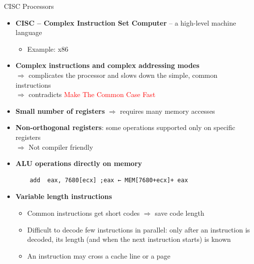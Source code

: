 \documentclass[aspectratio=169,12pt]{beamer}
\begin{document}
\begin{frame}[fragile]{CISC Processors}
\begin{itemize}
    \item \textbf{CISC -- Complex Instruction Set Computer} -- a high-level machine language
    \begin{itemize}
        \item Example: x86
    \end{itemize}
    \item \textbf{Complex instructions and complex addressing modes}\\
    $\Rightarrow$ complicates the processor and slows down the simple, common instructions\\
    $\Rightarrow$ contradicts \textcolor{red}{Make The Common Case Fast}
    \item \textbf{Small number of registers} $\Rightarrow$ requires many memory accesses
    \item \textbf{Non-orthogonal registers}: some operations supported only on specific registers\\
    $\Rightarrow$ Not compiler friendly
    \item \textbf{ALU operations directly on memory}
    \begin{verbatim}
    add  eax, 7680[ecx] ;eax ← MEM[7680+ecx]+ eax
    \end{verbatim}
    \item \textbf{Variable length instructions}
    \begin{itemize}
        \item Common instructions get short codes $\Rightarrow$ save code length
        \item Difficult to decode few instructions in parallel: only after an instruction is decoded, its length (and when the next instruction starts) is known
        \item An instruction may cross a cache line or a page
    \end{itemize}
\end{itemize}
\end{frame}
\end{document}
